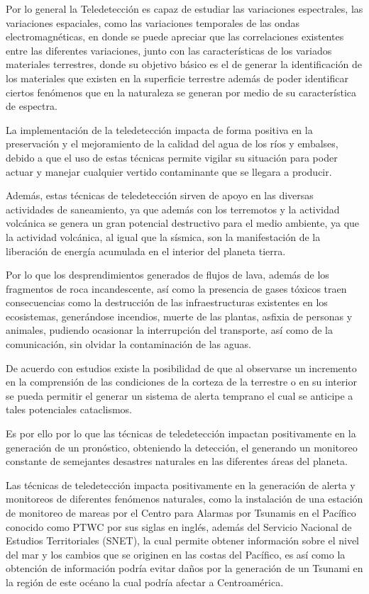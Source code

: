 Por lo general la Teledetección es capaz de estudiar las variaciones espectrales, las variaciones espaciales, como las variaciones temporales de las ondas electromagnéticas, en donde se puede apreciar que las correlaciones existentes entre las diferentes variaciones, junto con las características de los variados materiales terrestres, donde su objetivo básico es el de generar la identificación de los materiales que existen en la superficie terrestre además de poder identificar ciertos fenómenos que en la naturaleza se generan por medio de su característica de espectra.

La implementación de la teledetección impacta de forma positiva en la preservación y el mejoramiento de la calidad del agua de los ríos y embalses, debido a que el uso de estas técnicas permite vigilar su situación para poder actuar y manejar cualquier vertido contaminante que se llegara a producir. \cite{Rosello2009}

Además, estas técnicas de teledetección sirven de apoyo en las diversas actividades de saneamiento, ya que además con los terremotos y la actividad volcánica se genera un gran potencial destructivo para el medio ambiente, ya que la actividad volcánica, al igual que la sísmica, son la manifestación de la liberación de energía acumulada en el interior del planeta tierra.

Por lo que los desprendimientos generados de flujos de lava, además de los fragmentos de roca incandescente, así como la presencia de gases tóxicos traen consecuencias como la destrucción de las infraestructuras existentes en los ecosistemas, generándose incendios, muerte de las plantas, asfixia de personas y animales, pudiendo ocasionar la interrupción del transporte, así como de la comunicación, sin olvidar la contaminación de las aguas.

De acuerdo con estudios existe la posibilidad de que al observarse un incremento en la comprensión de las condiciones de la corteza de la terrestre o en su interior se pueda permitir el generar un sistema de alerta temprano el cual se anticipe a tales potenciales cataclismos.

Es por ello por lo que las técnicas de teledetección impactan positivamente en la generación de un pronóstico, obteniendo la detección, el generando un monitoreo constante de semejantes desastres naturales en las diferentes áreas del planeta. 

Las técnicas de teledetección impacta positivamente en la generación de alerta y monitoreos de diferentes fenómenos naturales, como la instalación de una estación de monitoreo de mareas por el Centro para Alarmas por Tsunamis en el Pacífico conocido como PTWC por sus siglas en inglés, además del Servicio Nacional de Estudios Territoriales (SNET), la cual permite obtener información sobre el nivel del mar y los cambios que se originen en las costas del Pacífico, es así como la obtención de información podría evitar daños por la generación de un Tsunami en la región de este océano la cual podría afectar a Centroamérica.

